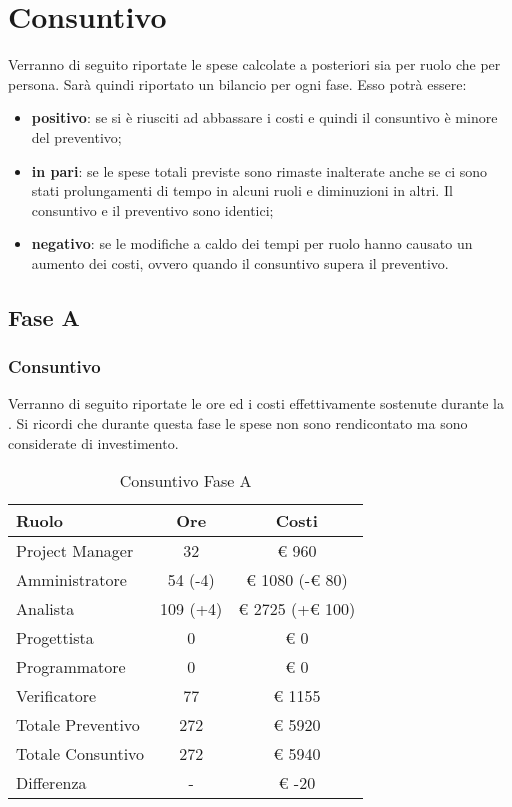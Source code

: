 \section{Consuntivo}
	Verranno di seguito riportate le spese calcolate a posteriori sia per ruolo che per persona.
	Sarà quindi riportato un bilancio per ogni fase. Esso potrà essere:
	\begin{itemize}
		\item \textbf{positivo}: se si è riusciti ad abbassare i costi e quindi il consuntivo è minore del preventivo;
		\item \textbf{in pari}: se le spese totali previste sono rimaste inalterate anche se ci sono stati prolungamenti di tempo in alcuni ruoli e diminuzioni in altri. Il consuntivo e il preventivo sono identici;
		\item \textbf{negativo}: se le modifiche a caldo dei tempi per ruolo hanno causato un aumento dei costi, ovvero quando il consuntivo supera il preventivo.
	\end{itemize}
	\subsection{Fase A}
		\subsubsection{Consuntivo}
			Verranno di seguito riportate le ore ed i costi effettivamente sostenute durante la . Si ricordi che durante questa fase le spese non sono rendicontato ma sono considerate di investimento.
			\begin{table}[H]
					\begin{center}
						\begin{tabular}{| l | c | c |}
							\hline
							Ruolo 			& Ore 	& Costi  \\ \hline
							
							Project Manager	& 32 		& \euro{} 960 	\\
							Amministratore 		& 54 	(-4)	& \euro{} 1080 (-\euro{} 80)	\\
							Analista	 		& 109 (+4)& \euro{} 2725 (+\euro{} 100)	\\
							Progettista 		& 0		& \euro{} 0 	\\
							Programmatore		& 0		& \euro{} 0	\\
							Verificatore		& 77		& \euro{} 1155 	\\ \hline \hline
							
							Totale Preventivo	& 272 	& \euro{} 5920 	\\ \hline
							Totale Consuntivo	& 272 	& \euro{} 5940 	\\ \hline
							Differenza			& - 		& \euro{} -20 	\\ \hline
						\end{tabular}
					\end{center}
					\caption{Consuntivo Fase A}
				\end{table}
